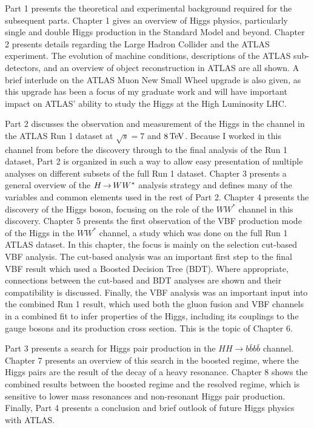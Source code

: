 Part 1 presents the theoretical and experimental background required for the subsequent parts. Chapter 1 gives an overview of Higgs physics, particularly single and double Higgs production in the Standard Model and beyond. Chapter 2 presents details regarding the Large Hadron Collider and the ATLAS experiment. The evolution of machine conditions, descriptions of the ATLAS sub-detectors, and an overview of object reconstruction in ATLAS are all shown. A brief interlude on the ATLAS Muon New Small Wheel upgrade is also given, as this upgrade has been a focus of my graduate work and will have important impact on ATLAS' ability to study the Higgs at the High Luminosity LHC. 

Part 2 discusses the observation and measurement of the Higgs in the \HWWfull channel in the ATLAS Run 1 dataset at $\sqrt{s} = 7$ and $8 \TeV$. Because I worked in this channel from before the discovery through to the final analysis of the Run 1 dataset, Part 2 is organized in such a way to allow easy presentation of multiple analyses on different subsets of the full Run 1 dataset. Chapter 3 presents a general overview of the $H{\,{\rightarrow}\,}WW^\ast$ analysis strategy and defines many of the variables and common elements used in the rest of Part 2. Chapter 4 presents the discovery of the Higgs boson, focusing on the role of the $WW^*$ channel in this discovery. Chapter 5 presents the first observation of the VBF production mode of the Higgs in the $WW^*$ channel, a study which was done on the full Run 1 ATLAS dataset. In this chapter, the focus is mainly on the selection cut-based VBF analysis. The cut-based analysis was an important first step to the final VBF result which used a Boosted Decision Tree (BDT). Where appropriate, connections between the cut-based and BDT analyses are shown and their compatibility is discussed. Finally, the VBF analysis was an important input into the combined Run 1 \HWWfull result, which used both the gluon fusion and VBF channels in a combined fit to infer properties of the Higgs, including its couplings to the gauge bosons and its production cross section. This is the topic of Chapter 6. 

Part 3 presents a search for Higgs pair production in the $HH \to b\bar{b} b\bar{b}$ channel. Chapter 7 presents an overview of this search in the boosted regime, where the Higgs pairs are the result of the decay of a heavy resonance. Chapter 8 shows the combined results between the boosted regime and the resolved regime, which is sensitive to lower mass resonances and non-resonant Higgs pair production. Finally, Part 4 presents a conclusion and brief outlook of future Higgs physics with ATLAS.